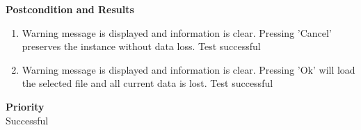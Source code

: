 \documentclass[12pt]{article}
\begin{document}
\noindent
{\bf Postcondition and Results}\
\begin{enumerate}
\item Warning message is displayed and information is clear. Pressing 'Cancel' preserves the instance without data loss. Test successful
\item Warning message is displayed and information is clear. Pressing 'Ok' will load the selected file and all current data is lost. Test successful
\end{enumerate}

\noindent
{\bf Priority}\\
Successful
\noindent
\end{document}
